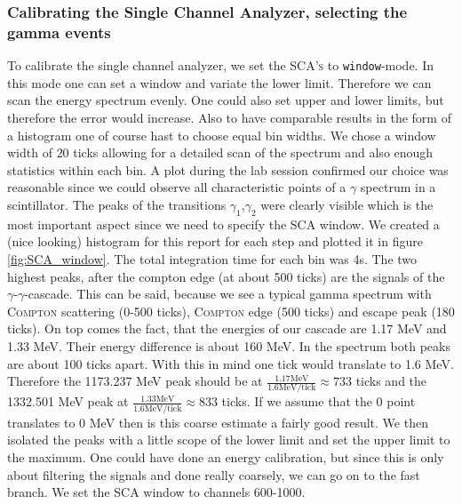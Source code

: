 \documentclass[11pt,a4paper,notitlepage]{scrartcl}
\begin{document}
\subsubsection{Calibrating the Single Channel Analyzer, selecting the gamma events}
To calibrate the single channel analyzer, we set the \textsc{SCA's} to \texttt{window}-mode. In this mode one can set a window and variate the lower limit. Therefore we can scan the energy spectrum evenly. One could also set upper and lower limits, but therefore the error would increase. Also to have comparable results in the form of a histogram one of course hast to choose equal bin widths. We chose a window width of $20$ ticks allowing for a detailed scan of the spectrum and also enough statistics within each bin. A plot during the lab session confirmed our choice was reasonable since we could observe all characteristic points of a $\gamma$ spectrum in a scintillator. The peaks of the transitions $\gamma_1$,$\gamma_2$ were clearly visible which is the most important aspect since we need to specify the SCA window. We created a (nice looking) histogram for this report for each step and plotted it in figure \ref{fig:SCA_window}. The total integration time for each bin was 4s. The two highest peaks, after the compton edge (at about 500 ticks) are the signals of the $\gamma$-$\gamma$-cascade. This can be said, because we see a typical gamma spectrum with \textsc{Compton} scattering (0-500 ticks), \textsc{Compton} edge (500 ticks) and escape peak (180 ticks). On top comes the fact, that the energies of our cascade are 1.17 MeV and 1.33 MeV. Their energy difference is about 160 MeV. In the spectrum both peaks are about 100 ticks apart. With this in mind one tick would translate to 1.6 MeV. Therefore  the 1173.237 MeV peak should be at $\frac{1.17\text{MeV}}{1.6\text{MeV/tick}}\approx 733$ ticks and the 1332.501 MeV peak at $\frac{1.33\text{MeV}}{1.6\text{MeV/tick}}\approx 833$ ticks. If we assume that the 0 point translates to 0 MeV then is this coarse estimate a fairly good result. We then isolated the peaks with a little scope of the lower limit and set the upper limit to the maximum. One could have done an energy calibration, but since this is only about filtering the signals and done really coarsely, we can go on to the fast branch. We set the SCA window to channels 600-1000.
\end{document}
